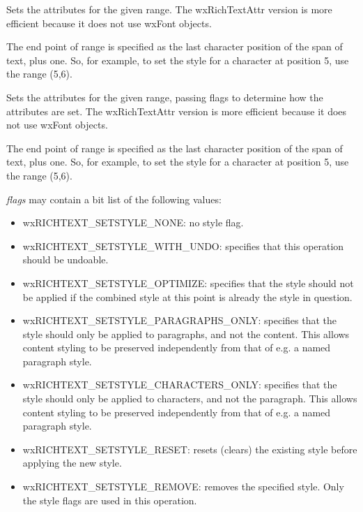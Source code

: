 

Sets the attributes for the given range. The wxRichTextAttr version is more efficient
because it does not use wxFont objects.

The end point of range is specified as the last character position of the span of text, plus one.
So, for example, to set the style for a character at position 5, use the range (5,6).

\label{wxrichtextctrlsetstyleex}




Sets the attributes for the given range, passing flags to determine how the attributes are set. The wxRichTextAttr version is more efficient
because it does not use wxFont objects.

The end point of range is specified as the last character position of the span of text, plus one.
So, for example, to set the style for a character at position 5, use the range (5,6).

{\it flags} may contain a bit list of the following values:

\begin{itemize}\itemsep=0pt
\item wxRICHTEXT\_SETSTYLE\_NONE: no style flag.
\item wxRICHTEXT\_SETSTYLE\_WITH\_UNDO: specifies that this operation should be undoable.
\item wxRICHTEXT\_SETSTYLE\_OPTIMIZE: specifies that the style should not be applied if the
combined style at this point is already the style in question.
\item wxRICHTEXT\_SETSTYLE\_PARAGRAPHS\_ONLY: specifies that the style should only be applied to paragraphs,
and not the content. This allows content styling to be preserved independently from that of e.g. a named paragraph style.
\item wxRICHTEXT\_SETSTYLE\_CHARACTERS\_ONLY: specifies that the style should only be applied to characters,
and not the paragraph. This allows content styling to be preserved independently from that of e.g. a named paragraph style.
\item wxRICHTEXT\_SETSTYLE\_RESET: resets (clears) the existing style before applying the new style.
\item wxRICHTEXT\_SETSTYLE\_REMOVE: removes the specified style. Only the style flags are used in this operation.
\end{itemize}

